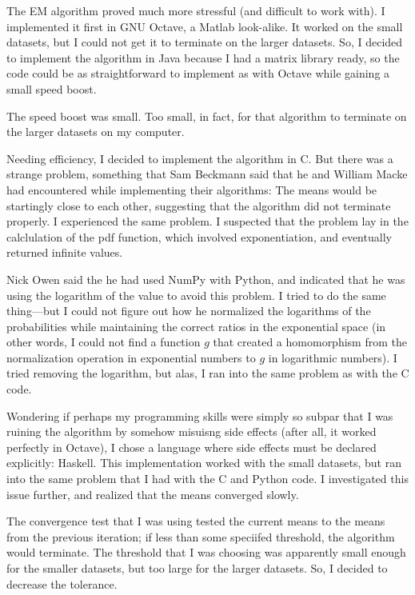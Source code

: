 \documentclass{journal}
\begin{document}
The EM algorithm proved much more stressful (and difficult to work with). I
implemented it first in GNU Octave, a Matlab look-alike. It worked on the small
datasets, but I could not get it to terminate on the larger datasets. So, I
decided to implement the algorithm in Java because I had a matrix library ready,
so the code could be as straightforward to implement as with Octave while
gaining a small speed boost.

The speed boost was small. Too small, in fact, for that algorithm to terminate
on the larger datasets on my computer.

Needing efficiency, I decided to implement the algorithm in C. But there was a
strange problem, something that Sam Beckmann said that he and William Macke had
encountered while implementing their algorithms: The means would be startingly
close to each other, suggesting that the algorithm did not terminate properly.
I experienced the same problem. I suspected that the problem lay in the
calclulation of the pdf function, which involved exponentiation, and eventually
returned infinite values.

Nick Owen said the he had used NumPy with Python, and indicated that he was
using the logarithm of the value to avoid this problem. I tried to do the same
thing---but I could not figure out how he normalized the logarithms of the
probabilities while maintaining the correct ratios in the exponential space (in
other words, I could not find a function $g$ that created a homomorphism from
the normalization operation in exponential numbers to $g$ in logarithmic
numbers). I tried removing the logarithm, but alas, I ran into the same problem
as with the C code.

Wondering if perhaps my programming skills were simply so subpar that I was
ruining the algorithm by somehow misuisng side effects (after all, it worked
perfectly in Octave), I chose a language where side effects must be declared
explicitly: Haskell. This implementation worked with the small datasets, but
ran into the same problem that I had with the C and Python code. I investigated
this issue further, and realized that the means converged slowly.

The convergence test that I was using tested the current means to the means from
the previous iteration; if less than some speciifed threshold, the algorithm
would terminate. The threshold that I was choosing was apparently small enough
for the smaller datasets, but too large for the larger datasets. So, I decided
to decrease the tolerance.
\end{document}
